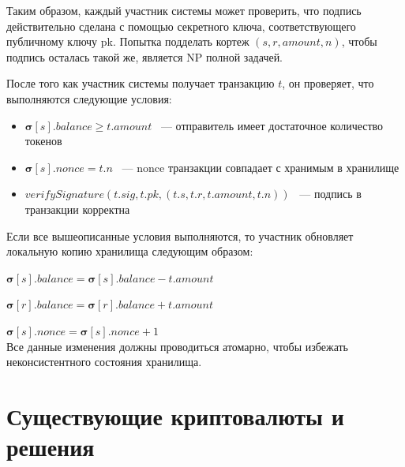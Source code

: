 \noindent Таким образом, каждый участник системы может проверить, что подпись действительно сделана с помощью секретного ключа, соответствующего публичному ключу pk. Попытка подделать кортеж $(s, r, amount, n)$, чтобы подпись осталась такой же, является NP полной задачей.

После того как участник системы получает транзакцию $t$, он проверяет, что выполняются следующие условия:
\begin{itemize}
\item $\boldsymbol{\sigma}[s].balance \ge t.amount$ ~--- отправитель имеет достаточное количество токенов
\item $\boldsymbol{\sigma}[s].nonce = t.n$ ~--- nonce транзакции совпадает с хранимым в хранилище
\item $verifySignature(t.sig, t.pk, (t.s, t.r, t.amount, t.n))$ ~--- подпись в транзакции корректна
\end{itemize}

Если все вышеописанные условия выполняются, то участник обновляет локальную копию хранилища следующим образом:

$\boldsymbol{\sigma}[s].balance = \boldsymbol{\sigma}[s].balance - t.amount$

$\boldsymbol{\sigma}[r].balance = \boldsymbol{\sigma}[r].balance + t.amount$

$\boldsymbol{\sigma}[s].nonce = \boldsymbol{\sigma}[s].nonce + 1$\\
Все данные изменения должны проводиться атомарно, чтобы избежать неконсистентного состояния хранилища.



\section{Существующие криптовалюты и решения}

